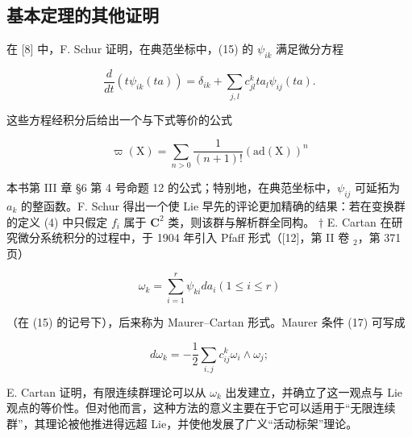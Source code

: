 \subsection*{基本定理的其他证明}

在 {[}8{]} 中，F. Schur 证明，在典范坐标中，(15) 的 \(\psi_{ik}\) 满足微分方程

\[
\frac {d}{d t} \left(t \psi_ {i k} (t a)\right) = \delta_ {i k} + \sum_ {j, l} c _ {j l} ^ {k} t a _ {l} \psi_ {i j} (t a).\tag{23}
\]

这些方程经积分后给出一个与下式等价的公式

\[
\varpi (\mathrm{X}) = \sum_ {n > 0} \frac {1}{(n + 1) !} (\mathrm{ad} (\mathrm{X})) ^ {n}\tag{24}
\]

本书第 III 章 §6 第 4 号命题 12 的公式；特别地，在典范坐标中，\(\psi_{ij}\) 可延拓为 \(a_k\) 的整函数。F. Schur 得出一个使 Lie 早先的评论更加精确的结果：若在变换群的定义 (4) 中只假定 \(f_i\) 属于 \(\mathbf{C}^2\) 类，则该群与解析群全同构。 \(\dagger\) E. Cartan 在研究微分系统积分的过程中，于 1904 年引入 Pfaff 形式（{[}12{]}，第 II 卷 \(_{2}\)，第 371 页）

\[
\omega_ {k} = \sum_ {i = 1} ^ {r} \psi_ {k i} d a _ {i} (1 \leqslant i \leqslant r)\tag{25}
\]

（在 (15) 的记号下），后来称为 Maurer--Cartan 形式。Maurer 条件 (17) 可写成

\[
d \omega_ {k} = - \frac {1}{2} \sum_ {i, j} c _ {i j} ^ {k} \omega_ {i} \wedge \omega_ {j};
\]

E. Cartan 证明，有限连续群理论可以从 \(\omega_{k}\) 出发建立，并确立了这一观点与 Lie 观点的等价性。但对他而言，这种方法的意义主要在于它可以适用于“无限连续群”，其理论被他推进得远超 Lie，并使他发展了广义“活动标架”理论。

